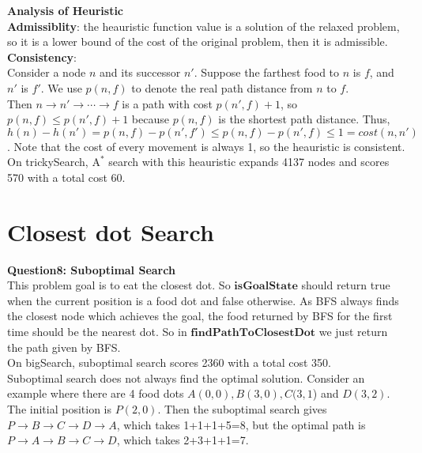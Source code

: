 \documentclass[UTF8]{ctexart}
\begin{document}
\textbf{Analysis of Heuristic}\\
\textbf{Admissiblity}: the heauristic function value is a solution of the relaxed problem, so it is a lower bound of the cost of the original problem, then it is admissible.\\
\textbf{Consistency}: \\
Consider a node $n$ and its successor $n'$. Suppose the farthest food to $n$ is $f$, and $n'$ is $f'$. We use $p(n, f)$ to denote the real path distance from $n$ to $f$.\\
Then $n\to n' \to \cdots \to f$ is a path with cost $p(n',f)+1$, so $p(n,f) \leq p(n',f) + 1$ because $p(n,f)$ is the shortest path distance.
Thus, $h(n)-h(n') = p(n,f)-p(n',f') \leq p(n,f)- p(n',f) \leq 1 = cost(n,n')$.
Note that the cost of every movement is always 1, so the heauristic is consistent.\\
On trickySearch, $\text{A}^*$ search with this heauristic expands 4137 nodes and scores 570 with a total cost 60.
\section{Closest dot Search}
\textbf{Question8: Suboptimal Search}\\
This problem goal is to eat the closest dot. So $\textbf{isGoalState}$ should return true when the current position is a food dot and false otherwise. As BFS always finds the closest node which achieves the goal, the food returned by BFS for the first time should be the nearest dot. So in $\textbf{findPathToClosestDot}$ we
just return the path given by BFS.\\
On bigSearch, suboptimal search scores 2360 with a total cost 350.\\
Suboptimal search does not always find the optimal solution. Consider an example where there are 4 food dots $A(0,0), B(3,0), C(3,1$) and $D(3,2)$. The initial position is $P(2,0)$. Then the suboptimal search gives $P \to B\to C \to D \to A$, which takes 1+1+1+5=8,
but the optimal path is $P \to A \to B \to C \to D$, which takes 2+3+1+1=7.\\
\end{document}
